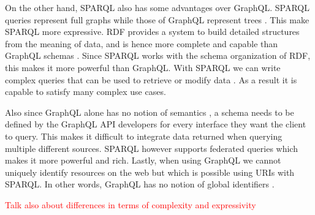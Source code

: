 On the other hand, SPARQL also has some advantages over GraphQL. SPARQL queries represent full graphs while those of GraphQL represent trees \cite{Taelman2018}. This make SPARQL more expressive. RDF provides a system to build detailed structures from the meaning of data, and is hence more complete and capable than GraphQL schemas \cite{Dresslar2019}. Since SPARQL works with the schema organization of RDF, this makes it more powerful than GraphQL. With SPARQL we can write complex queries that can be used to retrieve or modify data \cite{Angele2022}. As a result it is capable to satisfy many complex use cases.

Also since GraphQL alone has no notion of semantics \cite{Taelman2018}, a schema needs to be defined by the GraphQL API developers for every interface they want the client to query. This makes it difficult to integrate data returned when querying multiple different sources. SPARQL however supports federated queries which makes it more powerful and rich. Lastly, when using GraphQL we cannot uniquely identify resources on the web but which is possible using URIs with SPARQL. In other words, GraphQL has no notion of global identifiers \cite{Taelman2018}.



\textcolor{red}{Talk also about differences in terms of complexity and expressivity}
